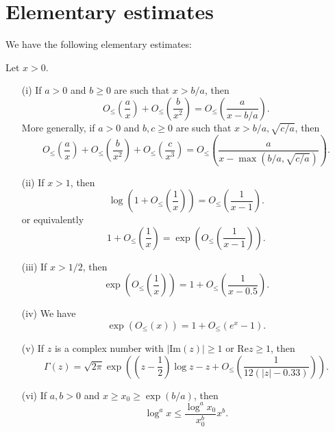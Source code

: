 \section{Elementary estimates}

We have the following elementary estimates:

\begin{lemma}\label{elem-lem} Let $x > 0$.
\begin{itemize}
\item[(i)] If $a > 0$ and $b \geq 0$ are such that $x > b/a$, then
$$O_{\leq}\left(\frac{a}{x}\right) + O_{\leq}\left( \frac{b}{x^2}\right ) = O_{\leq}\left( \frac{a}{x-b/a} \right).$$
More generally, if $a > 0$ and $b,c \geq 0$ are such that $x > b/a, \sqrt{c/a}$, then
$$O_{\leq}\left(\frac{a}{x}\right) + O_{\leq}\left( \frac{b}{x^2} \right) + O_{\leq}\left( \frac{c}{x^3}\right) = O_{\leq}\left( \frac{a}{x-\max(b/a,\sqrt{c/a})} \right).$$
\item[(ii)]  If $x > 1$, then
$$\log\left(1 + O_{\leq}\left(\frac{1}{x}\right) \right) = O_{\leq}\left(\frac{1}{x-1}\right).$$
or equivalently
$$1 + O_{\leq}\left(\frac{1}{x}\right) = \exp\left( O_{\leq}\left(\frac{1}{x-1}\right) \right).$$
\item[(iii)]  If $x > 1/2$, then
$$\exp\left( O_{\leq}\left(\frac{1}{x}\right) \right) = 1 + O_{\leq}\left( \frac{1}{x-0.5} \right).$$
\item[(iv)]  We have
$$ \exp\left(O_{\leq}(x)\right) = 1 + O_{\leq}(e^x-1).$$
\item[(v)] If $z$ is a complex number with $|\mathrm{Im}(z)| \geq 1$ or $\mathrm{Re} z \geq 1$, then
$$ \Gamma(z) = \sqrt{2\pi} \exp\left( (z-\frac{1}{2}) \log z - z + O_{\leq}\left( \frac{1}{12(|z| - 0.33)} \right)\right).$$
\item[(vi)] If $a,b > 0$ and $x \geq x_0 \geq \exp(b/a)$, then
$$\log^a x \leq \frac{\log^a x_0}{x_0^b} x^b.$$
\end{itemize}
\end{lemma}

